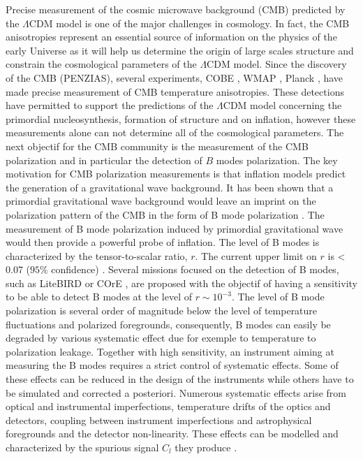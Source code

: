 Precise measurement of the cosmic microwave background (CMB) predicted by the $\Lambda$CDM model is one of the major challenges in cosmology. In fact, the CMB anisotropies represent an essential source of information on the physics of the early Universe as it will help us determine the origin of large scales structure and constrain the cosmological parameters of the $\Lambda$CDM model. Since the discovery of the CMB (PENZIAS), several experiments, COBE \citep{1992ApJ...396L...1S}, WMAP \citep{2013ApJS..208...20B}, Planck \citep{2016A&A...594A...1P}, have made precise measurement of CMB temperature anisotropies. These detections have permitted to support the predictions of the $\Lambda$CDM model concerning the primordial nucleosynthesis, formation of structure and on inflation, however these measurements alone can not determine all of the cosmological parameters. The next objectif for the CMB community is the measurement of the CMB polarization and in particular the detection of $B$ modes polarization. The key motivation for CMB polarization measurements is that  inflation models predict the generation of a gravitational wave background. It has been shown that a primordial gravitational wave background would leave an imprint on the polarization pattern of the CMB in the form of B mode polarization \citep{1997PhRvD..55.1830Z, 1997PhRvD..55.7368K}. The measurement of B mode polarization induced by primordial gravitational wave would then provide a powerful probe of inflation. The level of B modes is characterized by the tensor-to-scalar ratio, $r$. The current upper limit on $r$ is < 0.07 ($95 \%$ confidence) \citep{2016PhRvL.116c1302B}. Several missions focused on the detection of B modes, such as LiteBIRD \citep{2014JLTP..176..733M} or COrE \citep{2011arXiv1102.2181T}, are proposed with the objectif of having a sensitivity to be able to detect B modes at the level of $r \sim 10^{-3}$. The level of B mode polarization is several order of magnitude below the level of temperature fluctuations and polarized foregrounds, consequently, B modes can easily be degraded by various systematic effect due for exemple to temperature to polarization leakage. Together with high sensitivity, an instrument aiming at measuring the B modes requires a strict control of systematic effects.  
Some of these effects can be reduced in the design of the instruments while others have to be simulated and corrected a posteriori. Numerous systematic effects arise from optical and instrumental imperfections, temperature drifts of the optics and detectors, coupling between instrument imperfections and astrophysical foregrounds and the detector non-linearity. These effects can be modelled and characterized by the spurious signal $C_{l}$ they produce \citep{2008PhRvD..77h3003S,quickpol}. \\

